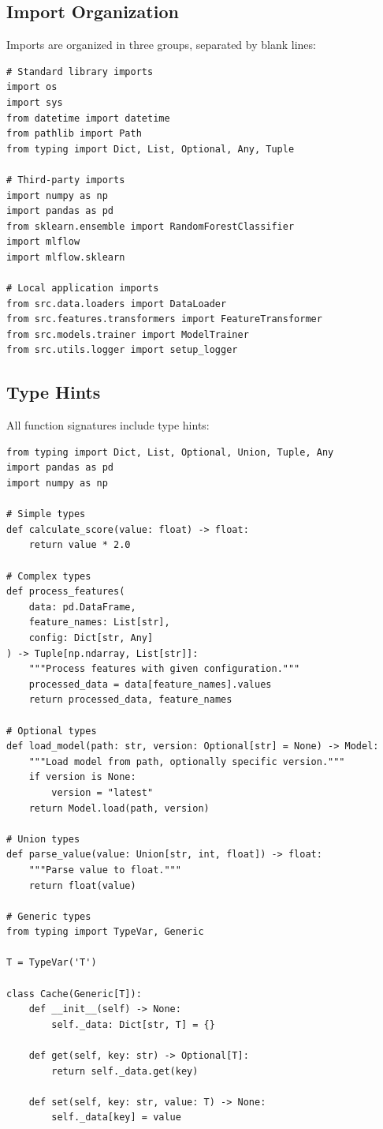 \subsection{Import Organization}

Imports are organized in three groups, separated by blank lines:

\begin{lstlisting}[style=python, caption=Import Organization]
# Standard library imports
import os
import sys
from datetime import datetime
from pathlib import Path
from typing import Dict, List, Optional, Any, Tuple

# Third-party imports
import numpy as np
import pandas as pd
from sklearn.ensemble import RandomForestClassifier
import mlflow
import mlflow.sklearn

# Local application imports
from src.data.loaders import DataLoader
from src.features.transformers import FeatureTransformer
from src.models.trainer import ModelTrainer
from src.utils.logger import setup_logger
\end{lstlisting}

\subsection{Type Hints}

All function signatures include type hints:

\begin{lstlisting}[style=python, caption=Type Hint Examples]
from typing import Dict, List, Optional, Union, Tuple, Any
import pandas as pd
import numpy as np

# Simple types
def calculate_score(value: float) -> float:
    return value * 2.0

# Complex types
def process_features(
    data: pd.DataFrame,
    feature_names: List[str],
    config: Dict[str, Any]
) -> Tuple[np.ndarray, List[str]]:
    """Process features with given configuration."""
    processed_data = data[feature_names].values
    return processed_data, feature_names

# Optional types
def load_model(path: str, version: Optional[str] = None) -> Model:
    """Load model from path, optionally specific version."""
    if version is None:
        version = "latest"
    return Model.load(path, version)

# Union types
def parse_value(value: Union[str, int, float]) -> float:
    """Parse value to float."""
    return float(value)

# Generic types
from typing import TypeVar, Generic

T = TypeVar('T')

class Cache(Generic[T]):
    def __init__(self) -> None:
        self._data: Dict[str, T] = {}

    def get(self, key: str) -> Optional[T]:
        return self._data.get(key)

    def set(self, key: str, value: T) -> None:
        self._data[key] = value
\end{lstlisting}

